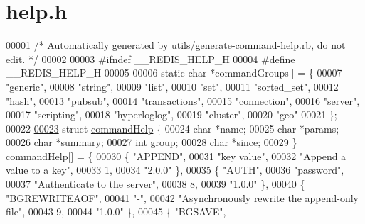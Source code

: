 \hypertarget{help_8h_source}{}\section{help.\+h}
\label{help_8h_source}

\begin{DoxyCode}
00001 \textcolor{comment}{/* Automatically generated by utils/generate-command-help.rb, do not edit. */}
00002 
00003 \textcolor{preprocessor}{#}\textcolor{preprocessor}{ifndef} \textcolor{preprocessor}{\_\_REDIS\_HELP\_H}
00004 \textcolor{preprocessor}{#}\textcolor{preprocessor}{define} \textcolor{preprocessor}{\_\_REDIS\_HELP\_H}
00005 
00006 \textcolor{keyword}{static} \textcolor{keywordtype}{char} *commandGroups[] = \{
00007     \textcolor{stringliteral}{"generic"},
00008     \textcolor{stringliteral}{"string"},
00009     \textcolor{stringliteral}{"list"},
00010     \textcolor{stringliteral}{"set"},
00011     \textcolor{stringliteral}{"sorted\_set"},
00012     \textcolor{stringliteral}{"hash"},
00013     \textcolor{stringliteral}{"pubsub"},
00014     \textcolor{stringliteral}{"transactions"},
00015     \textcolor{stringliteral}{"connection"},
00016     \textcolor{stringliteral}{"server"},
00017     \textcolor{stringliteral}{"scripting"},
00018     \textcolor{stringliteral}{"hyperloglog"},
00019     \textcolor{stringliteral}{"cluster"},
00020     \textcolor{stringliteral}{"geo"}
00021 \};
00022 
\hyperlink{structcommandHelp}{00023} \textcolor{keyword}{struct} \hyperlink{structcommandHelp}{commandHelp} \{
00024   \textcolor{keywordtype}{char} *name;
00025   \textcolor{keywordtype}{char} *params;
00026   \textcolor{keywordtype}{char} *summary;
00027   \textcolor{keywordtype}{int} group;
00028   \textcolor{keywordtype}{char} *since;
00029 \} commandHelp[] = \{
00030     \{ \textcolor{stringliteral}{"APPEND"},
00031     \textcolor{stringliteral}{"key value"},
00032     \textcolor{stringliteral}{"Append a value to a key"},
00033     1,
00034     \textcolor{stringliteral}{"2.0.0"} \},
00035     \{ \textcolor{stringliteral}{"AUTH"},
00036     \textcolor{stringliteral}{"password"},
00037     \textcolor{stringliteral}{"Authenticate to the server"},
00038     8,
00039     \textcolor{stringliteral}{"1.0.0"} \},
00040     \{ \textcolor{stringliteral}{"BGREWRITEAOF"},
00041     \textcolor{stringliteral}{"-"},
00042     \textcolor{stringliteral}{"Asynchronously rewrite the append-only file"},
00043     9,
00044     \textcolor{stringliteral}{"1.0.0"} \},
00045     \{ \textcolor{stringliteral}{"BGSAVE"},

\end{DoxyCode}
